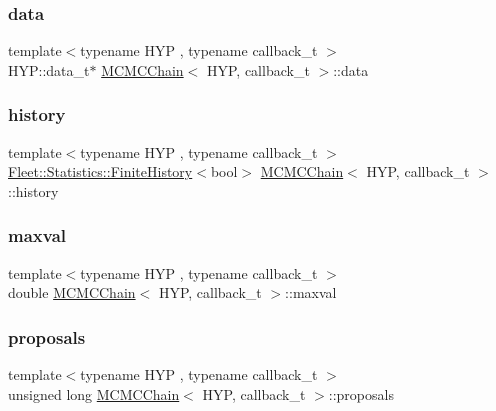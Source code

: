\mbox{\label{class_m_c_m_c_chain_ab235f08fad93a9626ffb566c001ed5c9}} 
\subsubsection{\texorpdfstring{data}{data}}
{\footnotesize\ttfamily template$<$typename H\+YP , typename callback\+\_\+t $>$ \\
H\+Y\+P\+::data\+\_\+t$\ast$ \hyperlink{class_m_c_m_c_chain}{M\+C\+M\+C\+Chain}$<$ H\+YP, callback\+\_\+t $>$\+::data}

\mbox{\label{class_m_c_m_c_chain_a2595f417e0c9cc847ac1dd70ed8b0763}} 
\subsubsection{\texorpdfstring{history}{history}}
{\footnotesize\ttfamily template$<$typename H\+YP , typename callback\+\_\+t $>$ \\
\hyperlink{class_fleet_1_1_statistics_1_1_finite_history}{Fleet\+::\+Statistics\+::\+Finite\+History}$<$bool$>$ \hyperlink{class_m_c_m_c_chain}{M\+C\+M\+C\+Chain}$<$ H\+YP, callback\+\_\+t $>$\+::history}

\mbox{\label{class_m_c_m_c_chain_a3b8d31f47d75503321b432eeac0bb13b}} 
\subsubsection{\texorpdfstring{maxval}{maxval}}
{\footnotesize\ttfamily template$<$typename H\+YP , typename callback\+\_\+t $>$ \\
double \hyperlink{class_m_c_m_c_chain}{M\+C\+M\+C\+Chain}$<$ H\+YP, callback\+\_\+t $>$\+::maxval}

\mbox{\label{class_m_c_m_c_chain_aec2cdd6a3e25447c7f34e31d0d98dbcb}} 
\subsubsection{\texorpdfstring{proposals}{proposals}}
{\footnotesize\ttfamily template$<$typename H\+YP , typename callback\+\_\+t $>$ \\
unsigned long \hyperlink{class_m_c_m_c_chain}{M\+C\+M\+C\+Chain}$<$ H\+YP, callback\+\_\+t $>$\+::proposals}

